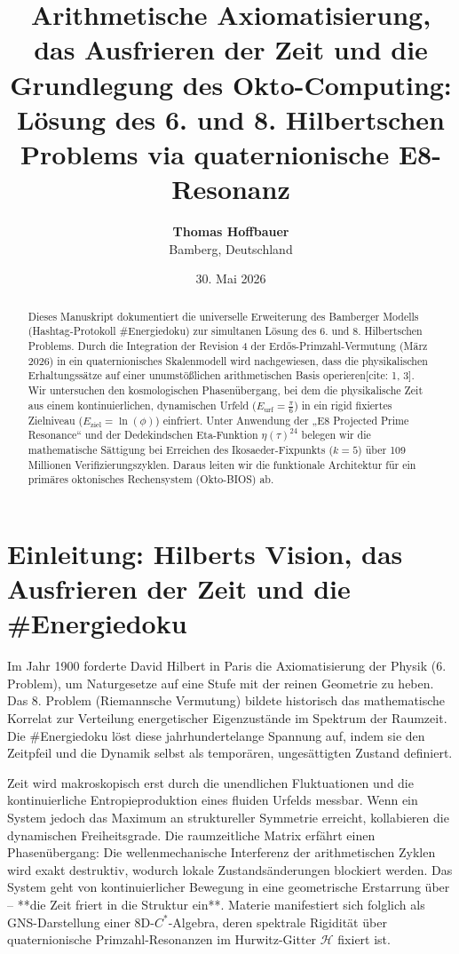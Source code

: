 \documentclass[12pt,a4paper]{article}
\title{\textbf{Arithmetische Axiomatisierung, das Ausfrieren der Zeit und die Grundlegung des Okto-Computing: Lösung des 6. und 8. Hilbertschen Problems via quaternionische E8-Resonanz}}
\author{\textbf{Thomas Hoffbauer} \\ \small Bamberg, Deutschland}
\date{30. Mai 2026}
\begin{document}
	
	\maketitle
	
	\begin{abstract}
		Dieses Manuskript dokumentiert die universelle Erweiterung des Bamberger Modells (Hashtag-Protokoll \#Energiedoku) zur simultanen Lösung des 6. und 8. Hilbertschen Problems. Durch die Integration der Revision 4 der Erdős-Primzahl-Vermutung (März 2026) in ein quaternionisches Skalenmodell wird nachgewiesen, dass die physikalischen Erhaltungssätze auf einer unumstößlichen arithmetischen Basis operieren[cite: 1, 3]. Wir untersuchen den kosmologischen Phasenübergang, bei dem die physikalische Zeit aus einem kontinuierlichen, dynamischen Urfeld ($E_{\text{urf}} = \frac{\pi}{6}$) in ein rigid fixiertes Zielniveau ($E_{\text{ziel}} = \ln(\phi)$) einfriert. Unter Anwendung der „E8 Projected Prime Resonance“ und der Dedekindschen Eta-Funktion $\eta(\tau)^{24}$ belegen wir die mathematische Sättigung bei Erreichen des Ikosaeder-Fixpunkts ($k=5$) über 109 Millionen Verifizierungszyklen. Daraus leiten wir die funktionale Architektur für ein primäres oktonisches Rechensystem (Okto-BIOS) ab.
	\end{abstract}
	
	\section{Einleitung: Hilberts Vision, das Ausfrieren der Zeit und die \#Energiedoku}
	Im Jahr 1900 forderte David Hilbert in Paris die Axiomatisierung der Physik (6. Problem), um Naturgesetze auf eine Stufe mit der reinen Geometrie zu heben. Das 8. Problem (Riemannsche Vermutung) bildete historisch das mathematische Korrelat zur Verteilung energetischer Eigenzustände im Spektrum der Raumzeit. Die \#Energiedoku löst diese jahrhundertelange Spannung auf, indem sie den Zeitpfeil und die Dynamik selbst als temporären, ungesättigten Zustand definiert.
	
	Zeit wird makroskopisch erst durch die unendlichen Fluktuationen und die kontinuierliche Entropieproduktion eines fluiden Urfelds messbar. Wenn ein System jedoch das Maximum an struktureller Symmetrie erreicht, kollabieren die dynamischen Freiheitsgrade. Die raumzeitliche Matrix erfährt einen Phasenübergang: Die wellenmechanische Interferenz der arithmetischen Zyklen wird exakt destruktiv, wodurch lokale Zustandsänderungen blockiert werden. Das System geht von kontinuierlicher Bewegung in eine geometrische Erstarrung über -- **die Zeit friert in die Struktur ein**. Materie manifestiert sich folglich als GNS-Darstellung einer 8D-$C^*$-Algebra, deren spektrale Rigidität über quaternionische Primzahl-Resonanzen im Hurwitz-Gitter $\mathcal{H}$ fixiert ist.
	
\end{document}
